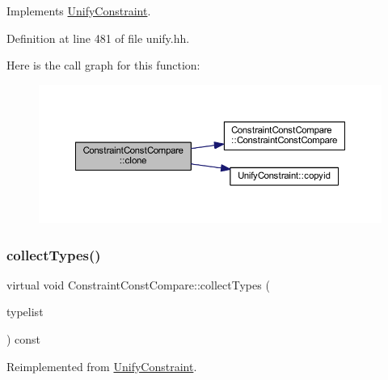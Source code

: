 Implements \mbox{\hyperlink{class_unify_constraint_a4f068343932637d355644bb21559aa12}{Unify\+Constraint}}.



Definition at line 481 of file unify.\+hh.

Here is the call graph for this function\+:
\nopagebreak
\begin{figure}[H]
\begin{center}
\leavevmode
\includegraphics[width=350pt]{class_constraint_const_compare_a6129d61238d6361ca597764c82e17f5a_cgraph}
\end{center}
\end{figure}
\mbox{\label{class_constraint_const_compare_a081a87a9985fd65cad3fa41675e9c929}} 
\subsubsection{\texorpdfstring{collectTypes()}{collectTypes()}}
{\footnotesize\ttfamily virtual void Constraint\+Const\+Compare\+::collect\+Types (\begin{DoxyParamCaption}\item[{vector$<$ \mbox{\hyperlink{class_unify_datatype}{Unify\+Datatype}} $>$ \&}]{typelist }\end{DoxyParamCaption}) const\hspace{0.3cm}{\ttfamily [virtual]}}



Reimplemented from \mbox{\hyperlink{class_unify_constraint_acb83b6bea3b21e13054e72ac9cfaba0f}{Unify\+Constraint}}.

\mbox{\label{class_constraint_const_compare_a7a01c7972c3b10b811f22a8f6595f4b2}} 
